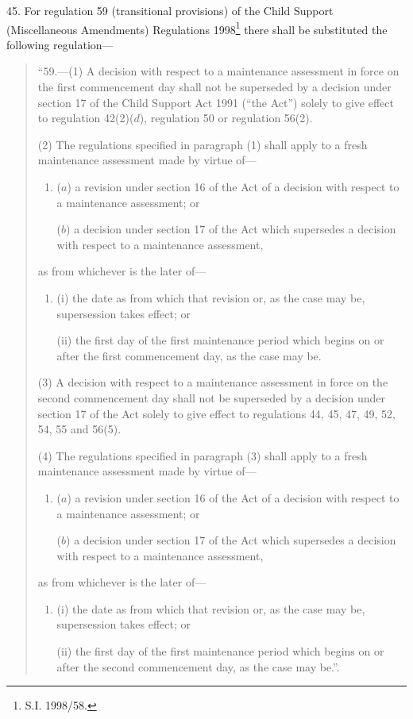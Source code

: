 \documentclass[12pt,a4paper]{article}
\begin{document}
45.  For regulation 59 (transitional provisions) of the Child Support (Miscellaneous Amendments) Regulations 1998\footnote{\frenchspacing S.I. 1998/58.} there shall be substituted the following regulation—
\begin{quotation}
“59.—(1) A decision with respect to a maintenance assessment in force on the first commencement day shall not be superseded by a decision under section 17 of the Child Support Act 1991 (“the Act”) solely to give effect to regulation 42(2)($d$), regulation 50 or regulation 56(2).

(2) The regulations specified in paragraph (1) shall apply to a fresh maintenance assessment made by virtue of—
\begin{enumerate}\item[]
($a$) a revision under section 16 of the Act of a decision with respect to a maintenance assessment; or

($b$) a decision under section 17 of the Act which supersedes a decision with respect to a maintenance assessment,
\end{enumerate}
as from whichever is the later of—
\begin{enumerate}\item[]
(i) the date as from which that revision or, as the case may be, supersession takes effect; or

(ii) the first day of the first maintenance period which begins on or after the first commencement day, as the case may be.
\end{enumerate}

(3) A decision with respect to a maintenance assessment in force on the second commencement day shall not be superseded by a decision under section 17 of the Act solely to give effect to regulations 44, 45, 47, 49, 52, 54, 55 and 56(5).

(4) The regulations specified in paragraph (3) shall apply to a fresh maintenance assessment made by virtue of—
\begin{enumerate}\item[]
($a$) a revision under section 16 of the Act of a decision with respect to a maintenance assessment; or

($b$) a decision under section 17 of the Act which supersedes a decision with respect to a maintenance assessment,
\end{enumerate}
as from whichever is the later of—
\begin{enumerate}\item[]
(i) the date as from which that revision or, as the case may be, supersession takes effect; or

(ii) the first day of the first maintenance period which begins on or after the second commencement day, as the case may be.”.
\end{enumerate}
\end{quotation}
\end{document}
